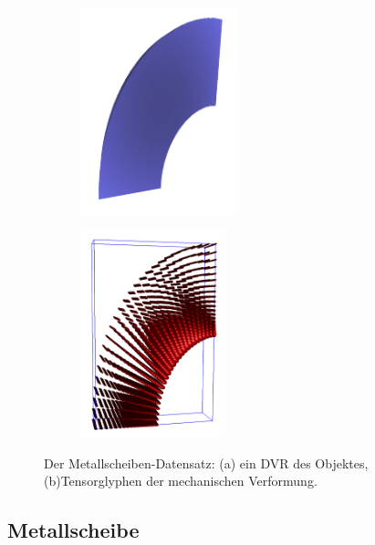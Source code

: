 \documentclass[a4paper,fontsize=12pt,toc=bib,halfparskip,ngerman]{scrartcl}
\begin{document}
\clearpage

\begin{figure}
	\hspace*{\fill}
	\begin{subfigure}{0.25\textwidth}
		\centering
		\includegraphics[height=6cm]{pictures/results/MetalDisk/MetalDisk_Object.png}
		\subcaption{}
		\label{MetalDiskObject}
	\end{subfigure}
	\hspace{2cm}
	\begin{subfigure}{0.25\textwidth}
		\centering
		\includegraphics[height=6cm]{pictures/results/MetalDisk/strain/MetalDisk_Strain_Ellipsoids.png}
		\subcaption{}
		\label{MetalDiskStrainEllipsoids}
	\end{subfigure}
	\hspace*{\fill}
	\caption{Der Metallscheiben-Datensatz: (a) ein DVR des Objektes, (b)Tensorglyphen der mechanischen Verformung.}
	\label{MetalDisk}
\end{figure}

\subsection{Metallscheibe}
\end{document}
